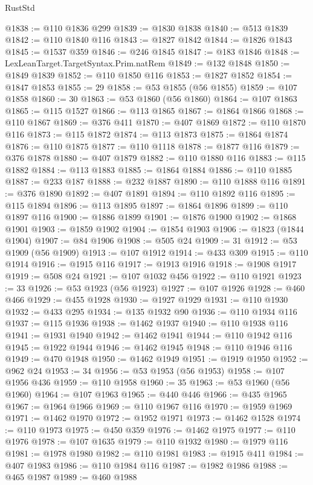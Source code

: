 \begin{lexlean}{RustStd}
\begin{coremodule}
@1838 := @110 @1836 @299
@1839 := @1830 @1838
@1840 := @513 @1839
@1842 := @110 @1840 @116
@1843 := @1827 @1842
@1844 := @1826 @1843
@1845 := @1537 @359
@1846 := @246 @1845
@1847 := @183 @1846
@1848 := LexLeanTarget.TargetSyntax.Prim.natRem
@1849 := @132 @1848
@1850 := @1849 @1839
@1852 := @110 @1850 @116
@1853 := @1827 @1852
@1854 := @1847 @1853
@1855 := 29
@1858 := @53 @1855 (@56 @1855)
@1859 := @107 @1858
@1860 := 30
@1863 := @53 @1860 (@56 @1860)
@1864 := @107 @1863
@1865 := @115 @1527
@1866 := @113 @1865
@1867 := @1864 @1866
@1868 := @110 @1867
@1869 := @376 @411
@1870 := @407 @1869
@1872 := @110 @1870 @116
@1873 := @115 @1872
@1874 := @113 @1873
@1875 := @1864 @1874
@1876 := @110 @1875
@1877 := @110 @1118
@1878 := @1877 @116
@1879 := @376 @1878
@1880 := @407 @1879
@1882 := @110 @1880 @116
@1883 := @115 @1882
@1884 := @113 @1883
@1885 := @1864 @1884
@1886 := @110 @1885
@1887 := @233 @187
@1888 := @232 @1887
@1890 := @110 @1888 @116
@1891 := @376 @1890
@1892 := @407 @1891
@1894 := @110 @1892 @116
@1895 := @115 @1894
@1896 := @113 @1895
@1897 := @1864 @1896
@1899 := @110 @1897 @116
@1900 := @1886 @1899
@1901 := @1876 @1900
@1902 := @1868 @1901
@1903 := @1859 @1902
@1904 := @1854 @1903
@1906 := @1823 (@1844 @1904)
@1907 := @84 @1906
@1908 := @505 @24
@1909 := 31
@1912 := @53 @1909 (@56 @1909)
@1913 := @107 @1912
@1914 := @433 @309
@1915 := @110 @1914
@1916 := @1915 @116
@1917 := @1913 @1916
@1918 := @1908 @1917
@1919 := @508 @24
@1921 := @107 @1032 @456
@1922 := @110 @1921
@1923 := 33
@1926 := @53 @1923 (@56 @1923)
@1927 := @107 @1926
@1928 := @460 @466
@1929 := @455 @1928
@1930 := @1927 @1929
@1931 := @110 @1930
@1932 := @433 @295
@1934 := @135 @1932 @90
@1936 := @110 @1934 @116
@1937 := @115 @1936
@1938 := @1462 @1937
@1940 := @110 @1938 @116
@1941 := @1931 @1940
@1942 := @1462 @1941
@1944 := @110 @1942 @116
@1945 := @1922 @1944
@1946 := @1462 @1945
@1948 := @110 @1946 @116
@1949 := @470 @1948
@1950 := @1462 @1949
@1951 := @1919 @1950
@1952 := @962 @24
@1953 := 34
@1956 := @53 @1953 (@56 @1953)
@1958 := @107 @1956 @436
@1959 := @110 @1958
@1960 := 35
@1963 := @53 @1960 (@56 @1960)
@1964 := @107 @1963
@1965 := @440 @446
@1966 := @435 @1965
@1967 := @1964 @1966
@1969 := @110 @1967 @116
@1970 := @1959 @1969
@1971 := @1462 @1970
@1972 := @1952 @1971
@1973 := @1462 @1528
@1974 := @110 @1973
@1975 := @450 @359
@1976 := @1462 @1975
@1977 := @110 @1976
@1978 := @107 @1635
@1979 := @110 @1932
@1980 := @1979 @116
@1981 := @1978 @1980
@1982 := @110 @1981
@1983 := @1915 @411
@1984 := @407 @1983
@1986 := @110 @1984 @116
@1987 := @1982 @1986
@1988 := @465 @1987
@1989 := @460 @1988

\end{coremodule}
\end{lexlean}
